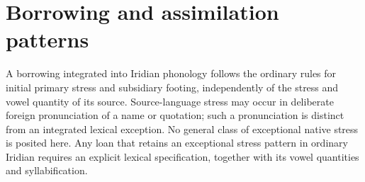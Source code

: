 \section{Borrowing and assimilation patterns}\label{sec:loan-prosody}

A borrowing integrated into Iridian phonology follows the ordinary rules for
initial primary stress and subsidiary footing, independently of the stress and
vowel quantity of its source. Source-language stress may occur in deliberate foreign pronunciation of a name or quotation;
such a pronunciation is distinct from an integrated lexical exception. No general
class of exceptional native stress is posited here. Any loan that retains an
exceptional stress pattern in ordinary Iridian requires an explicit lexical
specification, together with its vowel quantities and syllabification.

